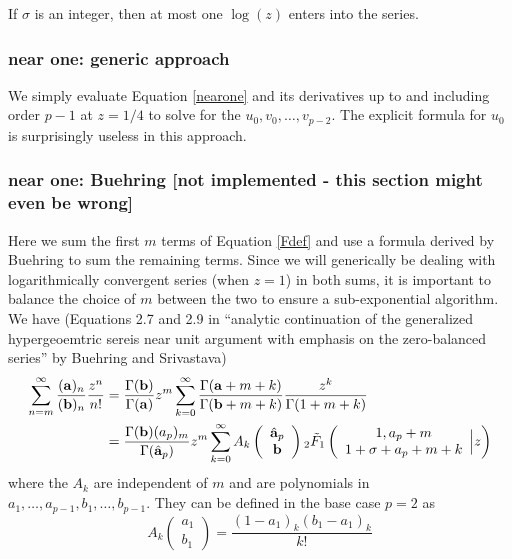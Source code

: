 \documentclass[10pt]{article}
\begin{document}
If $\sigma$ is an integer, then at most one $\log(z)$ enters into the series.
\subsubsection{near one: generic approach}
We simply evaluate Equation \ref{nearone} and its derivatives up to and including order $p-1$ at $z=1/4$ to solve for the $u_0,v_0,\dots,v_{p-2}$. The explicit formula for $u_0$ is surprisingly useless in this approach.

\subsubsection{near one: Buehring [not implemented - this section might even be wrong]}
Here we sum the first $m$ terms of Equation \ref{Fdef} and use a formula derived by Buehring to sum the remaining terms. Since we will generically be dealing with logarithmically convergent series (when $z=1$) in both sums, it is important to balance the choice of $m$ between the two to ensure a sub-exponential algorithm.
We have (Equations 2.7 and 2.9 in ``analytic continuation of the generalized hypergeoemtric sereis near unit argument with emphasis on the zero-balanced series'' by Buehring and Srivastava)
\begin{align*}
\sum_{n=m}^{\infty}{\frac{(\bold{a})_n}{(\bold{b})_n} \frac{z^n}{n!}}&=\frac{\Gamma(\bold{b})}{\Gamma(\bold{a})} z^m \sum_{k=0}^{\infty} {\frac{\Gamma(\bold{a}+m+k)}{\Gamma(\bold{b}+m+k)} \frac{z^k}{\Gamma(1+m+k)}}\\
&=\frac{\Gamma(\bold{b})(a_p)_m}{\Gamma(\hat{\bold{a}}_p)} z^m \sum_{k=0}^{\infty} {A_k\left(\begin{array}{c} \hat{\bold{a}}_p \\ \bold{b} \end{array}\right)} \, _2\tilde{F}_1\left( \begin{array}{c} 1,a_p+m \\ 1+\sigma+a_p+m+k \end{array} \Big| z\right)
\end{align*}
where the $A_k$ are independent of $m$ and are polynomials in $a_1,\dots,a_{p-1},b_1,\dots,b_{p-1}$. They can be defined in the base case $p=2$ as
\begin{equation*}
A_k\left(\begin{array}{c} a_1 \\ b_1 \end{array}\right) = \frac{(1-a_1)_k(b_1-a_1)_k}{k!}
\end{equation*}
\end{document}
